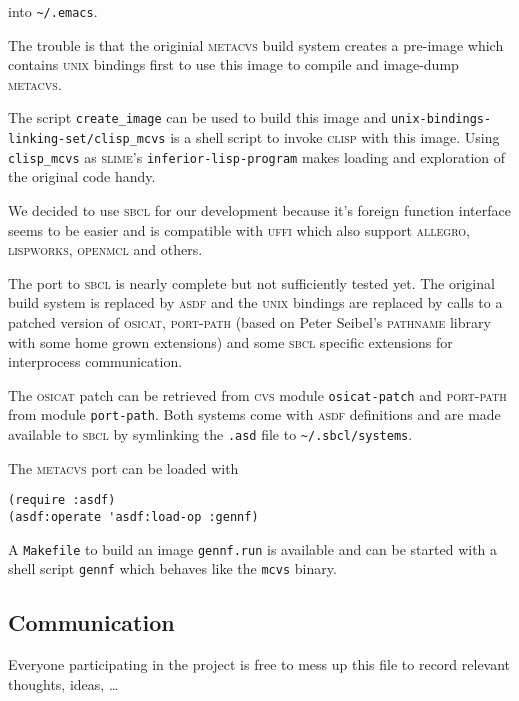 \documentclass[fleqn, 10pt, a4paper]{article}
\begin{document}
into \texttt{\textasciitilde/.emacs}.

The trouble is that the originial \textsc{metacvs} build system
creates a pre-image which contains \textsc{unix} bindings first to use
this image to compile and image-dump \textsc{metacvs}.

The script \texttt{create\_image} can be used to build this image
and \texttt{unix-bindings-linking-set/clisp\_mcvs} is a shell script
to invoke \textsc{clisp} with this image. Using \texttt{clisp\_mcvs}
as \textsc{slime}'s \texttt{inferior-lisp-program} makes loading
and exploration of the original code handy.

We decided to use \textsc{sbcl} for our development because it's
foreign function interface seems to be easier and is compatible with
\textsc{uffi} which also support \textsc{allegro}, \textsc{lispworks},
\textsc{openmcl} and others.

The port to \textsc{sbcl} is nearly complete but not sufficiently
tested yet. The original build system is replaced by \textsc{asdf}
and the \textsc{unix} bindings are replaced by calls to a patched version of
\textsc{osicat}, \textsc{port-path} (based on Peter Seibel's
\textsc{pathname} library with some home grown extensions) and some
\textsc{sbcl} specific extensions for interprocess communication.

The \textsc{osicat} patch can be retrieved from \textsc{cvs}
module \texttt{osicat-patch} and \textsc{port-path} from
module \texttt{port-path}. Both systems come with \textsc{asdf}
definitions and are made available to \textsc{sbcl} by symlinking
the \texttt{.asd} file to \texttt{\textasciitilde{}/.sbcl/systems}.

The \textsc{metacvs} port can be loaded with

\begin{verbatim}
(require :asdf)
(asdf:operate 'asdf:load-op :gennf)
\end{verbatim}

A \texttt{Makefile} to build an image \texttt{gennf.run}
is available and can be started with a shell script \texttt{gennf}
which behaves like the \texttt{mcvs} binary.


\subsection{Communication}

Everyone participating in the project is free to mess up this file to
record relevant thoughts, ideas, \ldots
\end{document}
